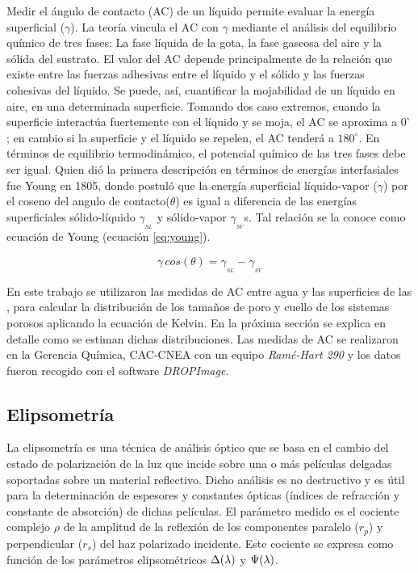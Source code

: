 		Medir el ángulo de contacto (AC) de un líquido permite evaluar la energía superficial ($\gamma$). La teoría vincula el AC con $\gamma$ mediante el análisis del equilibrio químico de tres fases: La fase líquida de la gota, la fase gaseosa del aire y la sólida del sustrato. El valor del AC depende principalmente de la relación que existe entre las fuerzas adhesivas entre el líquido y el sólido y las fuerzas cohesivas del líquido. Se puede, así, cuantificar la mojabilidad de un líquido en aire, en una determinada superficie.\cite{findenegg1997} Tomando dos caso extremos, cuando la superficie interactúa fuertemente con el líquido y se moja, el AC se aproxima a $0^{\circ}$; en cambio si la superficie y el líquido se repelen, el AC tenderá a $180^{\circ}$. En términos de equilibrio termodinámico, el potencial químico de las tres fases  debe ser igual. Quien dió la primera descripción en términos de energías interfasiales fue Young en 1805\cite{young1805}, donde postuló que la energía superficial líquido-vapor ($\gamma$) por el coseno del angulo de contacto($\theta$) es igual a diferencia de las energías superficiales sólido-líquido $\gamma_{_{SL}}$ y sólido-vapor $\gamma_{_{SV}}$s. Tal relación se la conoce como ecuación de Young (ecuación \ref{eq:young}).

			\begin{equation}
				\gamma\, cos(\theta) = \gamma_{_{SL}} - \gamma_{_{SV}}
				\label{eq:young} 
				\end{equation}

		En este trabajo se utilizaron las medidas de AC entre agua y las superficies de las \pdm, para calcular la distribución de los tamaños de poro y cuello de los sistemas porosos aplicando la ecuación de Kelvin.\cite{Boissiere2005} En la próxima sección se explica en detalle como se estiman dichas distribuciones.
		Las medidas de AC se realizaron en la Gerencia Química, CAC-CNEA con un equipo \textit{Ramé-Hart 290} y los datos fueron recogido con el software \textit{DROPImage}.

	\subsection{Elipsometría}\label{sec:elipso}

		La elipsometría es una técnica de análisis óptico que se basa en el cambio del estado de polarización de la luz que incide sobre una o más películas delgadas soportadas sobre un material reflectivo. Dicho análisis es no destructivo y es útil para la determinación de espesores y constantes ópticas (índices de refracción y constante de absorción) de dichas películas.\cite{TompkinsHarlandG.1999,Rothen1945} El parámetro medido es el cociente complejo $\rho$ de la amplitud de la reflexión de los componentes paralelo ($r_p$) y perpendicular ($r_s$) del haz polarizado incidente. Este cociente se expresa como función de los parámetros elipsométricos $\Delta(\lambda\index{longitud de onda})$ y $\Psi(\lambda\index{longitud de onda})$. 

